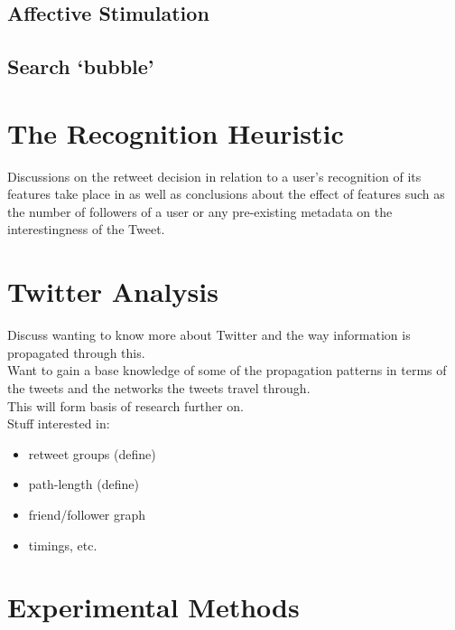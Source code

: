 \subsection{Affective Stimulation}

\subsection{Search `bubble'}

\section{The Recognition Heuristic} 
Discussions on the retweet decision in relation to a user's recognition of its features take place in \cite{chorley12} as well as conclusions about the effect of features such as the number of followers of a user or any pre-existing metadata on the interestingness of the Tweet.\\




\section{Twitter Analysis}
Discuss wanting to know more about Twitter and the way information is propagated through this. \\
Want to gain a base knowledge of some of the propagation patterns in terms of the tweets and the networks the tweets travel through. \\
This will form basis of research further on. \\ 
Stuff interested in:
\begin{itemize}
\item retweet groups (define)
\item path-length (define)
\item friend/follower graph 
\item timings, etc.
\end{itemize}

\section{Experimental Methods}
\label{experimental methods}

